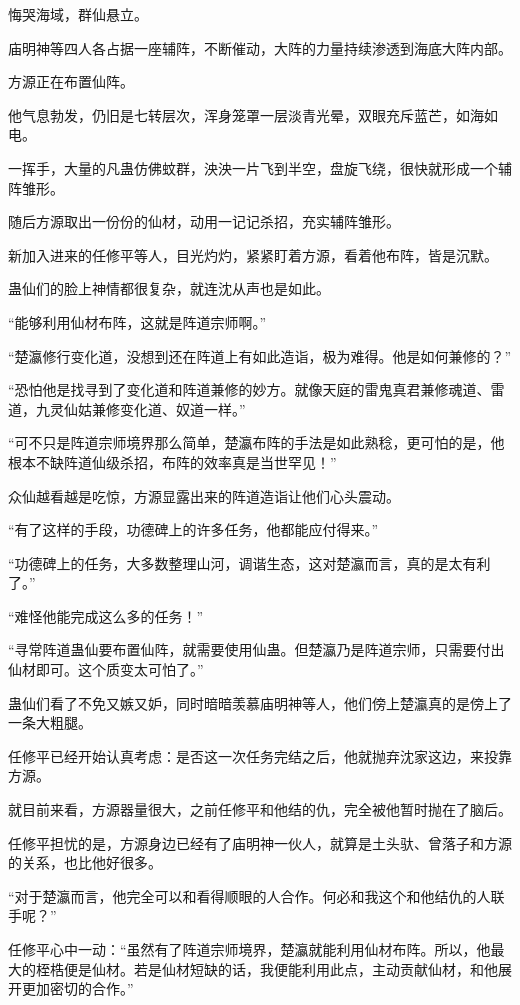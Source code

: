 
\begin{this_body}

悔哭海域，群仙悬立。

庙明神等四人各占据一座辅阵，不断催动，大阵的力量持续渗透到海底大阵内部。

方源正在布置仙阵。

他气息勃发，仍旧是七转层次，浑身笼罩一层淡青光晕，双眼充斥蓝芒，如海如电。

一挥手，大量的凡蛊仿佛蚊群，泱泱一片飞到半空，盘旋飞绕，很快就形成一个辅阵雏形。

随后方源取出一份份的仙材，动用一记记杀招，充实辅阵雏形。

新加入进来的任修平等人，目光灼灼，紧紧盯着方源，看着他布阵，皆是沉默。

蛊仙们的脸上神情都很复杂，就连沈从声也是如此。

“能够利用仙材布阵，这就是阵道宗师啊。”

“楚瀛修行变化道，没想到还在阵道上有如此造诣，极为难得。他是如何兼修的？”

“恐怕他是找寻到了变化道和阵道兼修的妙方。就像天庭的雷鬼真君兼修魂道、雷道，九灵仙姑兼修变化道、奴道一样。”

“可不只是阵道宗师境界那么简单，楚瀛布阵的手法是如此熟稔，更可怕的是，他根本不缺阵道仙级杀招，布阵的效率真是当世罕见！”

众仙越看越是吃惊，方源显露出来的阵道造诣让他们心头震动。

“有了这样的手段，功德碑上的许多任务，他都能应付得来。”

“功德碑上的任务，大多数整理山河，调谐生态，这对楚瀛而言，真的是太有利了。”

“难怪他能完成这么多的任务！”

“寻常阵道蛊仙要布置仙阵，就需要使用仙蛊。但楚瀛乃是阵道宗师，只需要付出仙材即可。这个质变太可怕了。”

蛊仙们看了不免又嫉又妒，同时暗暗羡慕庙明神等人，他们傍上楚瀛真的是傍上了一条大粗腿。

任修平已经开始认真考虑：是否这一次任务完结之后，他就抛弃沈家这边，来投靠方源。

就目前来看，方源器量很大，之前任修平和他结的仇，完全被他暂时抛在了脑后。

任修平担忧的是，方源身边已经有了庙明神一伙人，就算是土头驮、曾落子和方源的关系，也比他好很多。

“对于楚瀛而言，他完全可以和看得顺眼的人合作。何必和我这个和他结仇的人联手呢？”

任修平心中一动：“虽然有了阵道宗师境界，楚瀛就能利用仙材布阵。所以，他最大的桎梏便是仙材。若是仙材短缺的话，我便能利用此点，主动贡献仙材，和他展开更加密切的合作。”


\end{this_body}

